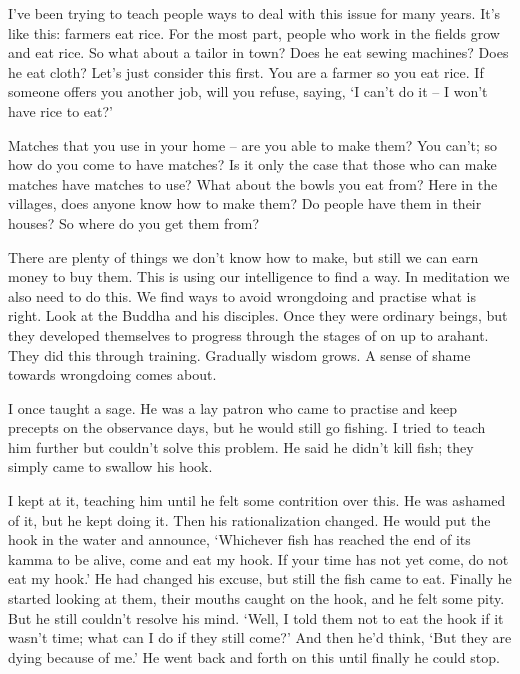 I've been trying to teach people ways to deal with this issue for many years. It's like this: farmers eat rice. For the most part, people who work in the fields grow and eat rice. So what about a tailor in town? Does he eat sewing machines? Does he eat cloth? Let's just consider this first. You are a farmer so you eat rice. If someone offers you another job, will you refuse, saying, `I can't do it -- I won't have rice to eat?'

Matches that you use in your home -- are you able to make them? You can't; so how do you come to have matches? Is it only the case that those who can make matches have matches to use? What about the bowls you eat from? Here in the villages, does anyone know how to make them? Do people have them in their houses? So where do you get them from?

There are plenty of things we don't know how to make, but still we can earn money to buy them. This is using our intelligence to find a way. In meditation we also need to do this. We find ways to avoid wrongdoing and practise what is right. Look at the Buddha and his disciples. Once they were ordinary beings, but they developed themselves to progress through the stages of  on up to arahant. They did this through training. Gradually wisdom grows. A sense of shame towards wrongdoing comes about.

I once taught a sage. He was a lay patron who came to practise and keep precepts on the observance days, but he would still go fishing. I tried to teach him further but couldn't solve this problem. He said he didn't kill fish; they simply came to swallow his hook.

I kept at it, teaching him until he felt some contrition over this. He was ashamed of it, but he kept doing it. Then his rationalization changed. He would put the hook in the water and announce, `Whichever fish has reached the end of its kamma to be alive, come and eat my hook. If your time has not yet come, do not eat my hook.' He had changed his excuse, but still the fish came to eat. Finally he started looking at them, their mouths caught on the hook, and he felt some pity. But he still couldn't resolve his mind. `Well, I told them not to eat the hook if it wasn't time; what can I do if they still come?' And then he'd think, `But they are dying because of me.' He went back and forth on this until finally he could stop.

